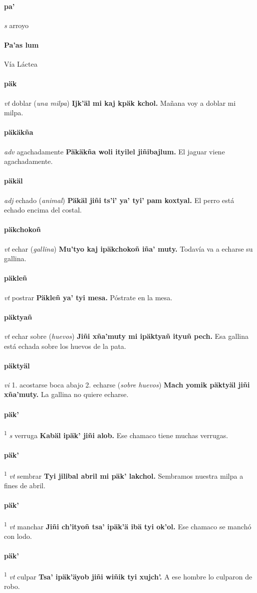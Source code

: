 \documentclass{scrbook}
\newcommand{\entry}[1]{\paragraph{#1}}
\newcommand{\onedefinition}[1]{#1.}
\newcommand{\defsuperscript}[1]{\textsuperscript{1}}
\newcommand{\partofspeech}[1]{\textit{#1}}
\newcommand{\spanishtranslation}[1]{#1}
\newcommand{\clarification}[1]{(\textit{#1})}
\newcommand{\cholexample}[1]{\textbf{#1}}
\newcommand{\exampletranslation}[1]{#1}
\begin{document}
\begin{multicols}{2}
\entry{pa'}
\partofspeech{s}
\spanishtranslation{arroyo}

\entry{Pa'as lum}
\spanishtranslation{Vía Láctea}

\entry{päk}
\partofspeech{vt}
\spanishtranslation{doblar}
\clarification{una milpa}
\cholexample{Ijk'äl mi kaj kpäk kchol.}
\exampletranslation{Mañana voy a doblar mi milpa.}

\entry{päkäkña}
\partofspeech{adv}
\spanishtranslation{agachadamente}
\cholexample{Päkäkña woli ityilel jiñibajlum.}
\exampletranslation{El jaguar viene agachadamente.}

\entry{päkäl}
\partofspeech{adj}
\spanishtranslation{echado}
\clarification{animal}
\cholexample{Päkäl jiñi ts'i' ya' tyi' pam koxtyal.}
\exampletranslation{El perro está echado encima del costal.}

\entry{päkchokoñ}
\partofspeech{vt}
\spanishtranslation{echar}
\clarification{gallina}
\cholexample{Mu'tyo kaj ipäkchokoñ iña' muty.}
\exampletranslation{Todavía va a echarse su gallina.}

\entry{päkleñ}
\partofspeech{vt}
\spanishtranslation{postrar}
\cholexample{Päkleñ ya' tyi mesa.}
\exampletranslation{Póstrate en la mesa.}

\entry{päktyañ}
\partofspeech{vt}
\spanishtranslation{echar sobre}
\clarification{huevos}
\cholexample{Jiñi xña'muty mi ipäktyañ ityuñ pech.}
\exampletranslation{Esa gallina está echada sobre los huevos de la pata.}

\entry{päktyäl}
\partofspeech{vi}
\onedefinition{1}
\spanishtranslation{acostarse boca abajo}
\onedefinition{2}
\spanishtranslation{echarse}
\clarification{sobre huevos}
\cholexample{Mach yomik päktyäl jiñi xña'muty.}
\exampletranslation{La gallina no quiere echarse.}

\entry{päk'}
\defsuperscript{4}
\partofspeech{s}
\spanishtranslation{verruga}
\cholexample{Kabäl ipäk' jiñi alob.}
\exampletranslation{Ese chamaco tiene muchas verrugas.}

\entry{päk'}
\defsuperscript{1}
\partofspeech{vt}
\spanishtranslation{sembrar}
\cholexample{Tyi jilibal abril mi päk' lakchol.}
\exampletranslation{Sembramos nuestra milpa a fines de abril.}

\entry{päk'}
\defsuperscript{2}
\partofspeech{vt}
\spanishtranslation{manchar}
\cholexample{Jiñi ch'ityoñ tsa' ipäk'ä ibä tyi ok'ol.}
\exampletranslation{Ese chamaco se manchó con lodo.}

\entry{päk'}
\defsuperscript{3}
\partofspeech{vt}
\spanishtranslation{culpar}
\cholexample{Tsa' ipäk'äyob jiñi wiñik tyi xujch'.}
\exampletranslation{A ese hombre lo culparon de robo.}


\end{multicols}
\end{document}
